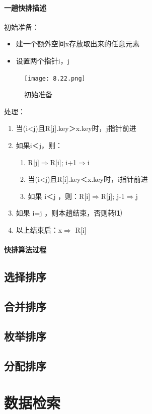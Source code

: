 \documentclass[AutoFakeBold]{LZUThesis2007}
\begin{document}
			\subsubsection{一趟快排描述}
初始准备：
\begin{itemize}
	\item 建一个额外空间x存放取出来的任意元素
	\item 设置两个指针i，j
\end{itemize}
\begin{figure}[H]
    \centering
    \texttt{[image: 8.22.png]}
    \caption{初始准备}
    \label{fig_install_texlive}
\end{figure}
处理：
\begin{enumerate}
	\item 当(i<j)且R[j].key＞x.key时，j指针前进
	\item 如果i＜j，则：
\begin{enumerate}
	\item R[j]$\Rightarrow$R[i];  i+1$\Rightarrow$i
	\item 当(i<j)且R[i].key＜x.key时，i指针前进
	\item 如果 i＜j ，则：R[i]$\Rightarrow$R[j];  j-1$\Rightarrow$j
\end{enumerate}
	\item 如果  i=j ，则本趟结束，否则转⑴
	\item 以上结束后：x$\Rightarrow$ R[i]
\end{enumerate}
			\subsubsection{快排算法过程}

	\section{选择排序}
	\section{合并排序}
	\section{枚举排序}
	\section{分配排序}

\chapter{数据检索}
\end{document}
